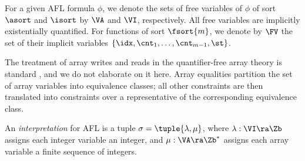 For a given AFL formula $\phi$, we denote the sets of free variables of $\phi$ of sort $\asort$ and $\isort$ by $\VA$ and $\VI$, respectively. All free variables are implicitly existentially quantified. For functions of sort $\fsort{m}$, we denote by $\FV$ the set of their implicit variables $\{\idx,\cnt_1,\ldots,\cnt_{m-1},\st \}$.


The treatment of array writes and reads in the quantifier-free array theory is standard \cite{QuantifierFreeArrays}, and we do not elaborate on it here.
Array equalities partition the set of array variables into equivalence classes; all other constraints are then translated into constraints over a representative of the corresponding equivalence class.

An \emph{interpretation} for AFL is a tuple $\sigma = \tuple{\lambda,\mu}$, where
$\lambda: \VI \ra \Zb$ assigns each integer variable an integer, and
$\mu: \VA \ra \Zb^*$ assigns each array variable a finite sequence of integers.



